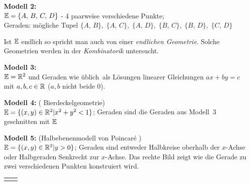 {\bf Modell 2:}\\
$\mathbb E=\{A,\,B,\,C,\,D\}$ - 4 paarweise verschiedene Punkte;\\
Geraden: mögliche Tupel $\{A,\,B\},\;\{A,\,C\},\;\{A,\,D\},\;\{B,\,C\},\;\{B,\,D\},\;\{C,\,D\}$

Ist $\mathbb E$ endlich so spricht man auch von einer {\em endlichen Geometrie}.
Solche Geometrien werden in der {\em Kombinatorik} untersucht.


{\bf Modell 3:}\\$\mathbb E=\mathbb R^2$ und Geraden \glqq wie üblich\grqq\ als
Lösungen linearer Gleichungen $a x + b y = c$ mit $a,b,c\in \mathbb R$ ($a,b$
nicht beide $0$).

{\bf Modell 4:} ( \glqq Bierdeckelgeometrie\grqq )\\ %
$\mathbb E=\{ (x,y)\in\mathbb R^2 | x^2+y^2<1 \}$;
Geraden sind die Geraden aus Modell~3 geschnitten mit $\mathbb E$

\begin{center}
	
\end{center}


\bigskip


{\bf Modell 5:} (\glqq Halbebenenmodell von Poincar\'e \grqq )\\
$\mathbb E=\{ (x,y)\in\mathbb R^2 | y>0 \}$;
Geraden sind entweder Halbkreise oberhalb der $x$-Achse
oder Halbgeraden Senkrecht zur $x$-Achse. Das rechte Bild zeigt wie 
die Gerade zu zwei verschiedenen Punkten konstruiert wird. 


\begin{center}
	\begin{tabular}{cc}
		
		&
		
	\end{tabular}
\end{center}


\medskip


